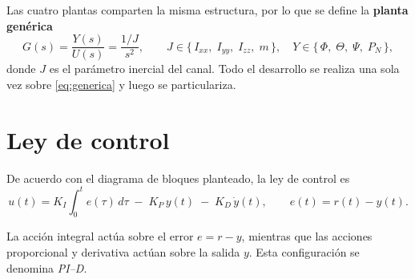 \documentclass[11pt,a4paper]{article}
\begin{document}
Las cuatro plantas comparten la misma estructura, por lo que se define la
\textbf{planta genérica}
\begin{equation}
G(s)=\frac{Y(s)}{U(s)}=\frac{1/J}{s^{2}},
\qquad
J \in \{\,I_{xx},\;I_{yy},\;I_{zz},\;m\,\},\quad
Y \in \{\,\Phi,\;\Theta,\;\Psi,\;P_N\,\},
\label{eq:generica}
\end{equation}
donde $J$ es el parámetro inercial del canal. Todo el desarrollo se realiza una
sola vez sobre \eqref{eq:generica} y luego se particulariza.

\section{Ley de control}

De acuerdo con el diagrama de bloques planteado, la ley de control es
\begin{equation}
u(t) = K_I \int_{0}^{t} e(\tau)\,d\tau \;-\; K_P\, y(t) \;-\; K_D\, \dot y(t),
\qquad e(t)=r(t)-y(t).
\label{eq:leycontrol}
\end{equation}

La acción integral actúa sobre el error $e=r-y$, mientras que las acciones
proporcional y derivativa actúan sobre la salida $y$. Esta configuración se
denomina \emph{PI--D}.
\end{document}
